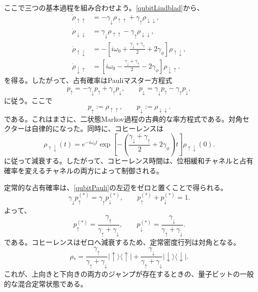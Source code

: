 \documentclass[a4paper,11pt,oneside]{article}
\theoremstyle{definition}
\numberwithin{equation}{section}
\begin{document}
ここで三つの基本過程を組み合わせよう。\eqref{qubitLindblad}から、
\begin{align}
\dot\rho_{\uparrow\uparrow}
&=
-\gamma_\downarrow \rho_{\uparrow\uparrow}
+\gamma_\uparrow \rho_{\downarrow\downarrow} ,
\\
\dot\rho_{\downarrow\downarrow}
&=
\gamma_\downarrow \rho_{\uparrow\uparrow}
-\gamma_\uparrow \rho_{\downarrow\downarrow} ,
\\
\dot\rho_{\uparrow\downarrow}
&=
-\left[
i\omega_0+\frac{\gamma_\downarrow+\gamma_\uparrow}{2}+2\gamma_\phi
\right]\rho_{\uparrow\downarrow} ,
\\
\dot\rho_{\downarrow\uparrow}
&=
\left[
i\omega_0-\frac{\gamma_\downarrow+\gamma_\uparrow}{2}-2\gamma_\phi
\right]\rho_{\downarrow\uparrow} .
\end{align}
を得る。したがって、占有確率はPauliマスター方程式
\begin{equation}\label{qubitPauli}
\dot p_\uparrow
=
-\gamma_\downarrow p_\uparrow + \gamma_\uparrow p_\downarrow ,
\qquad
\dot p_\downarrow
=
\gamma_\downarrow p_\uparrow - \gamma_\uparrow p_\downarrow ,
\end{equation}
に従う。ここで
\begin{equation}
p_\uparrow := \rho_{\uparrow\uparrow},
\qquad
p_\downarrow := \rho_{\downarrow\downarrow}.
\end{equation}
である。これはまさに、二状態Markov過程の古典的な率方程式である。対角セクターは自律的になった。同時に、コヒーレンスは
\begin{equation}
\rho_{\uparrow\downarrow}(t)
=
e^{-i\omega_0 t}
\exp\!\left[
-\left(\frac{\gamma_\downarrow+\gamma_\uparrow}{2}+2\gamma_\phi\right)t
\right]
\rho_{\uparrow\downarrow}(0) .
\end{equation}
に従って減衰する。したがって、コヒーレンス時間は、位相緩和チャネルと占有確率を変えるチャネルの両方によって制御される。



定常的な占有確率は、\eqref{qubitPauli}の左辺をゼロと置くことで得られる。
\begin{equation}
\gamma_\downarrow p_\uparrow^{(\ast)}
=
\gamma_\uparrow p_\downarrow^{(\ast)} ,
\qquad
p_\uparrow^{(\ast)}+p_\downarrow^{(\ast)}=1 .
\end{equation}
よって、
\begin{equation}\label{qubitfixedpoint}
p_\uparrow^{(\ast)}
=
\frac{\gamma_\uparrow}{\gamma_\uparrow+\gamma_\downarrow},
\qquad
p_\downarrow^{(\ast)}
=
\frac{\gamma_\downarrow}{\gamma_\uparrow+\gamma_\downarrow} .
\end{equation}
である。コヒーレンスはゼロへ減衰するため、定常密度行列は対角となる。
\begin{equation}
\rho_\ast
=
\frac{\gamma_\uparrow}{\gamma_\uparrow+\gamma_\downarrow}
|\uparrow\rangle\langle\uparrow|
+
\frac{\gamma_\downarrow}{\gamma_\uparrow+\gamma_\downarrow}
|\downarrow\rangle\langle\downarrow| .
\end{equation}
これが、上向きと下向きの両方のジャンプが存在するときの、量子ビットの一般的な混合定常状態である。
\end{document}
